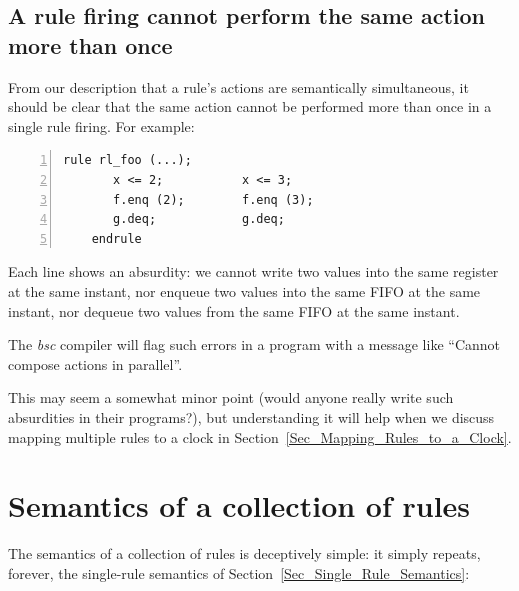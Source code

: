 
\subsection{A rule firing cannot perform the same action more than once}

\label{Sec_Parallel_Conflict}

From our description that a rule's actions are semantically
simultaneous, it should be clear that the same action cannot be
performed more than once in a single rule firing.  For example:

{\footnotesize
\begin{Verbatim}[frame=single, numbers=left]
    rule rl_foo (...);
       x <= 2;           x <= 3;
       f.enq (2);        f.enq (3);
       g.deq;            g.deq;
    endrule
\end{Verbatim}
}

Each line shows an absurdity: we cannot write two values into the same
register at the same instant, nor enqueue two values into the same
FIFO at the same instant, nor dequeue two values from the same FIFO at
the same instant.

The \emph{bsc} compiler will flag such errors in a program with a
message like ``Cannot compose actions in parallel''.

This may seem a somewhat minor point (would anyone really write such
absurdities in their programs?), but understanding it will help when
we discuss mapping multiple rules to a clock in
Section~\ref{Sec_Mapping_Rules_to_a_Clock}.


\section{Semantics of a collection of rules}

\label{Sec_Rules_Semantics}


The semantics of a collection of rules is deceptively simple: it
simply repeats, forever, the single-rule semantics of
Section~\ref{Sec_Single_Rule_Semantics}:

\begin{center}
\end{center}

